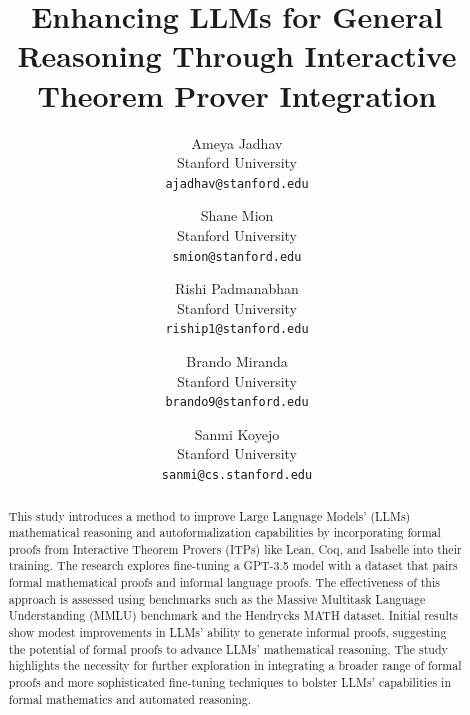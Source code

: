 \documentclass[10pt,twocolumn,letterpaper]{article}
\title{Enhancing LLMs for General Reasoning Through Interactive Theorem Prover Integration}
\author{
Ameya Jadhav \\
Stanford University \\
\texttt{ajadhav@stanford.edu} \\
\and
Shane Mion \\
Stanford University \\
\texttt{smion@stanford.edu} \\
\and
Rishi Padmanabhan \\
Stanford University \\
\texttt{riship1@stanford.edu}
\and
Brando Miranda \\
Stanford University \\
\texttt{brando9@stanford.edu}
\and
Sanmi Koyejo \\
Stanford University \\
\texttt{sanmi@cs.stanford.edu}
}
\date{}
\begin{document}
\maketitle

\begin{abstract}
This study introduces a method to improve Large Language Models' (LLMs) mathematical reasoning and autoformalization capabilities by incorporating formal proofs from Interactive Theorem Provers (ITPs) like Lean, Coq, and Isabelle into their training. The research explores fine-tuning a GPT-3.5 model with a dataset that pairs formal mathematical proofs and informal language proofs. The effectiveness of this approach is assessed using benchmarks such as the Massive Multitask Language Understanding (MMLU) benchmark and the Hendrycks MATH dataset. Initial results show modest improvements in LLMs' ability to generate informal proofs, suggesting the potential of formal proofs to advance LLMs' mathematical reasoning. The study highlights the necessity for further exploration in integrating a broader range of formal proofs and more sophisticated fine-tuning techniques to bolster LLMs' capabilities in formal mathematics and automated reasoning.
\end{abstract}









\end{document}
